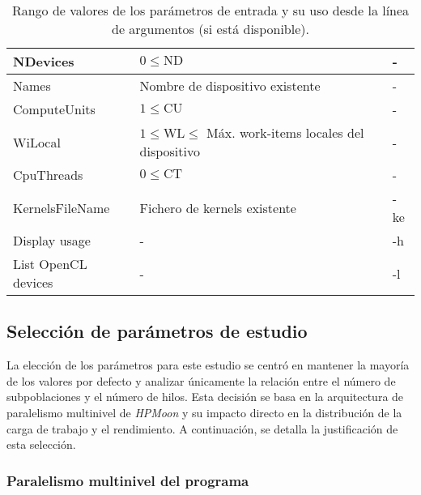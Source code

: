 \begin{table}[htbp]
\begin{tabular}{|p{3cm}|p{6cm}|p{2.2cm}|}
        NDevices            & $0 \leq \mathrm{ND}$                                                    & -                   \\ \hline
        Names               & Nombre de dispositivo existente                                         & -                   \\ \hline
        ComputeUnits        & $1 \leq \mathrm{CU}$                                                    & -                   \\ \hline
        WiLocal             & $1 \leq \mathrm{WL} \leq$ Máx. work-items locales del dispositivo       & -                   \\ \hline
        CpuThreads          & $0 \leq \mathrm{CT}$                                                    & -                   \\ \hline
        KernelsFileName     & Fichero de kernels existente                                            & -ke                 \\ \hline
        Display usage       & -                                                                       & -h                  \\ \hline
        List OpenCL devices & -                                                                       & -l                  \\ \hline
    \end{tabular}
    \caption{Rango de valores de los parámetros de entrada y su uso desde la línea de argumentos (si está disponible).}
    \label{tab:HPMoon_parametros}
\end{table}

\subsection{Selección de parámetros de estudio}

La elección de los parámetros para este estudio se centró en mantener la mayoría de los valores por defecto y analizar únicamente la relación entre el número de subpoblaciones y el número de hilos. Esta decisión se basa en la arquitectura de paralelismo multinivel de \textit{HPMoon} y su impacto directo en la distribución de la carga de trabajo y el rendimiento. A continuación, se detalla la justificación de esta selección.

\subsubsection{Paralelismo multinivel del programa}

